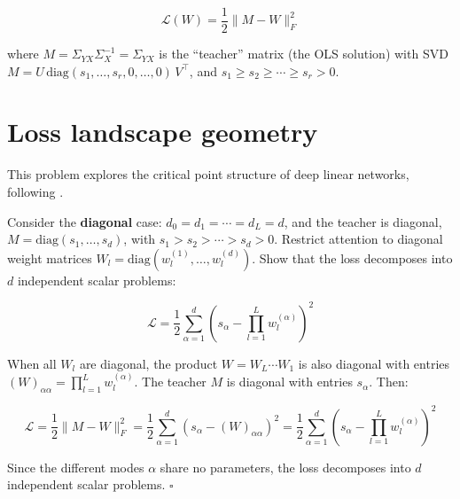 \documentclass[11pt]{article}
\begin{document}
\[\mathcal{L}(W) = \frac{1}{2}\|M - W\|_F^2\]

where \(M = \Sigma_{YX} \Sigma_X^{-1} = \Sigma_{YX}\) is the ``teacher'' matrix (the
OLS solution) with SVD
\(M = U \,\text{diag}(s_1, \ldots, s_r, 0, \ldots, 0)\, V^\top\), and
\(s_1 \geq s_2 \geq \cdots \geq s_r > 0\).

%
%
%
%
%
%

\section{Loss landscape geometry}
\label{sec:td-geometry}

This problem explores the critical point structure of deep linear
networks, following \cite{achour2024}.

\begin{exercise}
\label{ex:td-1a}
Consider the \textbf{diagonal} case:
\(d_0 = d_1 = \cdots = d_L = d\), and the teacher is diagonal,
\(M = \text{diag}(s_1, \ldots, s_d)\), with
\(s_1 > s_2 > \cdots > s_d > 0\). Restrict attention to diagonal weight
matrices \(W_l = \text{diag}(w_l^{(1)}, \ldots, w_l^{(d)})\). Show that
the loss decomposes into \(d\) independent scalar problems:

\[\mathcal{L} = \frac{1}{2}\sum_{\alpha=1}^d \left(s_\alpha - \prod_{l=1}^L w_l^{(\alpha)}\right)^2\]
\end{exercise}

\begin{solution}[ex:td-1a]
When all \(W_l\) are diagonal, the product
\(W = W_L \cdots W_1\) is also diagonal with entries
\((W)_{\alpha\alpha} = \prod_{l=1}^L w_l^{(\alpha)}\). The teacher \(M\)
is diagonal with entries \(s_\alpha\). Then:

\[\mathcal{L} = \frac{1}{2}\|M - W\|_F^2 = \frac{1}{2}\sum_{\alpha=1}^d (s_\alpha - (W)_{\alpha\alpha})^2 = \frac{1}{2}\sum_{\alpha=1}^d \left(s_\alpha - \prod_{l=1}^L w_l^{(\alpha)}\right)^2\]

Since the different modes \(\alpha\) share no parameters, the loss
decomposes into \(d\) independent scalar problems. \(\square\)
\end{solution}
\end{document}
